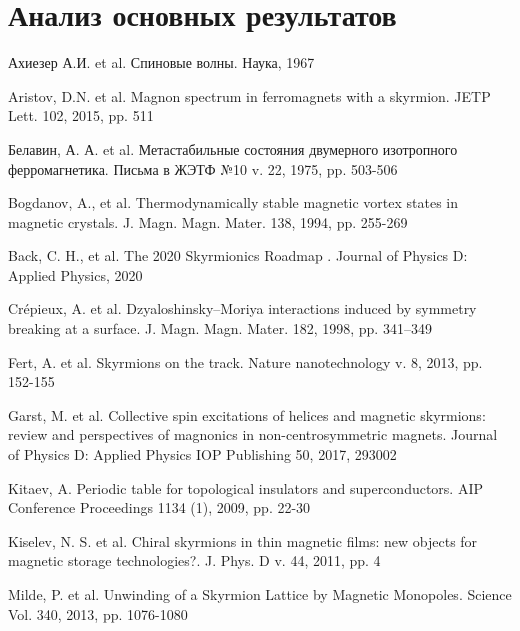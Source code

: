 \documentclass[a4paper,article,14pt]{extarticle}
\begin{document}
\pagebreak
\section{ Анализ основных результатов }




\pagebreak
{}
\pagebreak
\begin{thebibliography}{1}
 Ахиезер А.И. et al. \flqq Спиновые волны\frqq. Наука, 1967

 Aristov, D.N. et al. \flqq Magnon spectrum in ferromagnets with a skyrmion\frqq. JETP Lett. 102, 2015, pp. 511

 Белавин, А. А. et al. \flqq Метастабильные состояния двумерного изотропного ферромагнетика\frqq. Письма в ЖЭТФ №10 v. 22, 1975, pp. 503-506

 Bogdanov, A., et al. \flqq Thermodynamically stable magnetic vortex states in magnetic crystals\frqq. J. Magn. Magn. Mater. 138, 1994, pp. 255-269
 
 Back, C. H., et al.  \flqq The 2020 Skyrmionics Roadmap \frqq. Journal of Physics D: Applied Physics, 2020

 Crépieux, A. et al. \flqq Dzyaloshinsky–Moriya interactions induced by symmetry breaking at a surface\frqq.  J. Magn. Magn. Mater. 182, 1998, pp. 341–349

 Fert, A. et al. \flqq Skyrmions on the track\frqq. Nature nanotechnology v. 8, 2013, pp. 152-155

 Garst, M. et al. \flqq Collective spin excitations of helices and magnetic skyrmions: review and perspectives of magnonics in non-centrosymmetric magnets\frqq. Journal of Physics D: Applied Physics IOP Publishing 50, 2017, 293002

 Kitaev, A. \flqq Periodic table for topological insulators and superconductors\frqq. AIP Conference Proceedings 1134 (1), 2009, pp. 22-30

 Kiselev, N. S. et al. \flqq Chiral skyrmions in thin magnetic films: new objects for magnetic storage technologies?\frqq. J. Phys. D v. 44, 2011, pp. 4

 Milde, P. et al. \flqq Unwinding of a Skyrmion Lattice by Magnetic Monopoles\frqq. Science Vol. 340, 2013, pp. 1076-1080


\end{thebibliography}
\end{document}
